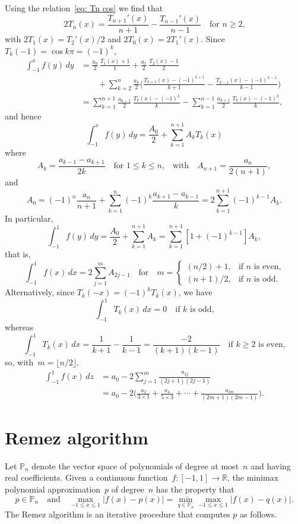 \documentclass[12pt,a4paper]{article}
\begin{document}
Using the relation~\eqref{eq: Tn cos} we find that
\[
2T_n(x)=\frac{T_{n+1}'(x)}{n+1}-\frac{T_{n-1}'(x)}{n-1}\quad\text{for $n\ge2$,}
\]
with $2T_1(x)=T_2'(x)/2$ and $2T_0(x)=2T_1'(x)$.  Since 
$T_k(-1)=\cos k\pi=(-1)^k$,
\begin{align*}
\int_{-1}^xf(y)\,dy&=\frac{a_0}{2}\,\frac{T_1(x)+1}{1}
    +\frac{a_1}{2}\,\frac{T_2(x)-1}{2}\\
    &\qquad{}+\sum_{k=2}^n\frac{a_k}{2}\biggl(
     \frac{T_{k+1}(x)-(-1)^{k+1}}{k+1}
    -\frac{T_{k-1}(x)-(-1)^{k-1}}{k-1}\biggr)\\
&=\sum_{k=1}^{n+1}\frac{a_{k-1}}{2}\,\frac{T_k(x)-(-1)^k}{k}
    -\sum_{k=1}^{n-1}\frac{a_{k+1}}{2}\,\frac{T_k(x)-(-1)^k}{k},
\end{align*}
and hence
\[
\int_{-1}^x f(y)\,dy=\frac{A_0}{2}+\sum_{k=1}^{n+1}A_kT_k(x)
\]
where
\[
A_k=\frac{a_{k-1}-a_{k+1}}{2k}\quad\text{for $1\le k\le n$,}
\quad\text{with}\quad A_{n+1}=\frac{a_n}{2(n+1)},
\]
and
\[
A_0=(-1)^n\frac{a_n}{n+1}+\sum_{k=1}^n(-1)^k\frac{a_{k+1}-a_{k-1}}{k}
    =2\sum_{k=1}^{n+1}(-1)^{k-1}A_k.
\]
In particular,
\[
\int_{-1}^1f(y)\,dy=\frac{A_0}{2}+\sum_{k=1}^{n+1}A_k
    =\sum_{k=1}^{n+1}[1+(-1)^{k-1}]A_k,
\]
that is,
\[
\int_{-1}^1f(x)\,dx=2\sum_{j=1}^m A_{2j-1}\quad\text{for}\quad
m=\begin{cases}
(n/2)+1,&\text{if $n$ is even,}\\
(n+1)/2,&\text{if $n$ is odd.}
\end{cases}
\]
Alternatively, since $T_k(-x)=(-1)^kT_k(x)$, we have
\[
\int_{-1}^1T_k(x)\,dx=0\quad\text{if $k$ is odd,}
\]
whereas
\[
\int_{-1}^1T_k(x)\,dx=\frac{1}{k+1}-\frac{1}{k-1}=\frac{-2}{(k+1)(k-1)}
\quad\text{if $k\ge2$ is even,}
\]
so, with~$m=\lfloor n/2\rfloor$,
\begin{align*}
\int_{-1}^1f(x)\,dz&=a_0
    -2\sum_{j=1}^m\frac{a_{2j}}{(2j+1)(2j-1)}\\
    &=a_0-2\biggl(\frac{a_2}{3\times1}+\frac{a_4}{5\times3}+\cdots
    +\frac{a_{2m}}{(2m+1)(2m-1)}\biggr).
\end{align*}
\section{Remez algorithm}
Let $\mathbb{P}_n$ denote the vector space of polynomials of degree at most~$n$ 
and having real coefficients. Given a continuous 
function~$f:[-1,1]\to\mathbb{R}$, the minimax polynomial approximation~$p$ of 
degree~$n$ has the property that
\[
p\in\mathbb{P}_n\quad\text{and}\quad
\max_{-1\le x\le 1}|f(x)-p(x)|=\min_{q\in\mathbb{P}_n}\max_{-1\le x\le 1}
|f(x)-q(x)|.
\]
The Remez algorithm is an iterative procedure that computes $p$ as follows.
\end{document}
